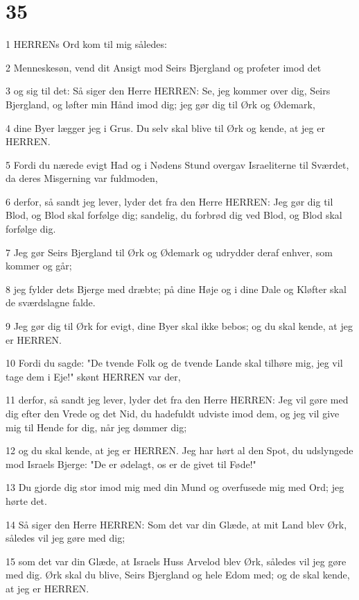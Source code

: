 \chapter{35}

\par 1 HERRENs Ord kom til mig således:
\par 2 Menneskesøn, vend dit Ansigt mod Seirs Bjergland og profeter imod det
\par 3 og sig til det: Så siger den Herre HERREN: Se, jeg kommer over dig, Seirs Bjergland, og løfter min Hånd imod dig; jeg gør dig til Ørk og Ødemark,
\par 4 dine Byer lægger jeg i Grus. Du selv skal blive til Ørk og kende, at jeg er HERREN.
\par 5 Fordi du nærede evigt Had og i Nødens Stund overgav Israeliterne til Sværdet, da deres Misgerning var fuldmoden,
\par 6 derfor, så sandt jeg lever, lyder det fra den Herre HERREN: Jeg gør dig til Blod, og Blod skal forfølge dig; sandelig, du forbrød dig ved Blod, og Blod skal forfølge dig.
\par 7 Jeg gør Seirs Bjergland til Ørk og Ødemark og udrydder deraf enhver, som kommer og går;
\par 8 jeg fylder dets Bjerge med dræbte; på dine Høje og i dine Dale og Kløfter skal de sværdslagne falde.
\par 9 Jeg gør dig til Ørk for evigt, dine Byer skal ikke bebos; og du skal kende, at jeg er HERREN.
\par 10 Fordi du sagde: "De tvende Folk og de tvende Lande skal tilhøre mig, jeg vil tage dem i Eje!" skønt HERREN var der,
\par 11 derfor, så sandt jeg lever, lyder det fra den Herre HERREN: Jeg vil gøre med dig efter den Vrede og det Nid, du hadefuldt udviste imod dem, og jeg vil give mig til Hende for dig, når jeg dømmer dig;
\par 12 og du skal kende, at jeg er HERREN. Jeg har hørt al den Spot, du udslyngede mod Israels Bjerge: "De er ødelagt, os er de givet til Føde!"
\par 13 Du gjorde dig stor imod mig med din Mund og overfusede mig med Ord; jeg hørte det.
\par 14 Så siger den Herre HERREN: Som det var din Glæde, at mit Land blev Ørk, således vil jeg gøre med dig;
\par 15 som det var din Glæde, at Israels Huss Arvelod blev Ørk, således vil jeg gøre med dig. Ørk skal du blive, Seirs Bjergland og hele Edom med; og de skal kende, at jeg er HERREN.

